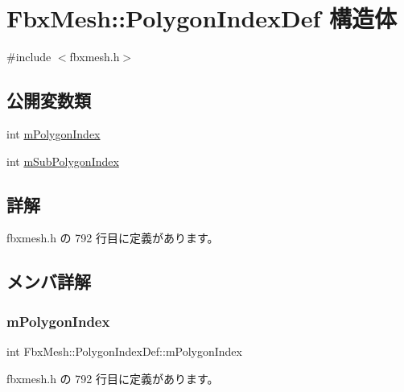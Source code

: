 \hypertarget{struct_fbx_mesh_1_1_polygon_index_def}{}\section{Fbx\+Mesh\+:\+:Polygon\+Index\+Def 構造体}
\label{struct_fbx_mesh_1_1_polygon_index_def}


{\ttfamily \#include $<$fbxmesh.\+h$>$}

\subsection*{公開変数類}
\begin{DoxyCompactItemize}
\item 
int \hyperlink{struct_fbx_mesh_1_1_polygon_index_def_a5166ed1381f4a0d1be4c1a8db56abca2}{m\+Polygon\+Index}
\item 
int \hyperlink{struct_fbx_mesh_1_1_polygon_index_def_a082dbd8eba06dff88ab65e33c1582005}{m\+Sub\+Polygon\+Index}
\end{DoxyCompactItemize}


\subsection{詳解}


 fbxmesh.\+h の 792 行目に定義があります。



\subsection{メンバ詳解}
\mbox{\label{struct_fbx_mesh_1_1_polygon_index_def_a5166ed1381f4a0d1be4c1a8db56abca2}} 
\subsubsection{\texorpdfstring{m\+Polygon\+Index}{mPolygonIndex}}
{\footnotesize\ttfamily int Fbx\+Mesh\+::\+Polygon\+Index\+Def\+::m\+Polygon\+Index}



 fbxmesh.\+h の 792 行目に定義があります。

